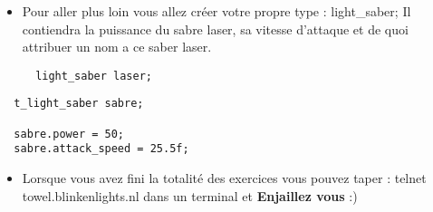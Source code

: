 \documentclass{koala-en}
\begin{document}
\begin{itemize}
  \item
Pour aller plus loin vous allez créer votre propre type : light\_saber;
Il contiendra la puissance du sabre laser, sa vitesse d'attaque et de quoi attribuer un nom a ce saber laser.
\begin{lstlisting}
  light_saber laser;
\end{lstlisting}
\end{itemize}
\begin{lstlisting}
  t_light_saber sabre;

  sabre.power = 50;
  sabre.attack_speed = 25.5f;
\end{lstlisting}

\begin{itemize}
    \item
        
        Lorsque vous avez fini la totalité des exercices vous pouvez taper : telnet towel.blinkenlights.nl dans un terminal et \textbf{Enjaillez vous} :)
\end{itemize}
\thispagestyle{fancy}
\end{document}
